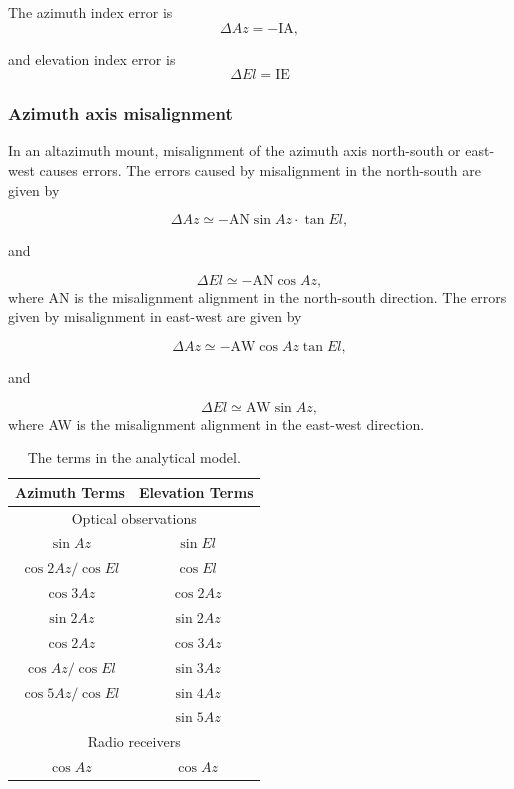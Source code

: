 The azimuth index error is 
\begin{equation}
    \Delta Az = -\text{IA},
\end{equation}

and elevation index error is
\begin{equation}\label{eq:pmodel_ie}
    \Delta El = \text{IE}
\end{equation}

\subsubsection{Azimuth axis misalignment} 

In an altazimuth mount, misalignment of the azimuth axis north-south or east-west causes errors.
The errors caused by misalignment in the north-south are given by

\begin{equation}
    \Delta Az \simeq - \text{AN} \sin{Az} \cdot \tan{El},
\end{equation}

and

\begin{equation}
    \Delta El \simeq - \text{AN} \cos{Az},
\end{equation}
where AN is the misalignment alignment in the north-south direction.
The errors given by misalignment in east-west are given by

\begin{equation}
    \Delta Az \simeq - \text{AW} \cos{Az} \tan{El},
\end{equation}

and

\begin{equation}
    \Delta El \simeq \text{AW} \sin{Az},
\end{equation}
where AW is the misalignment alignment in the east-west direction.

\begin{table}[h]
    \centering
    \caption{The terms in the analytical model. }
    \begin{tabular}{cc}
    \textbf{Azimuth Terms} & \textbf{Elevation Terms} \\
    \hline
    \multicolumn{2}{c}{Optical observations} \\ 
    \cline{1-2}
    \hline
    $\sin{Az}$ & $\sin{El}$ \\
    $\cos{2Az}/\cos{El}$ & $\cos{El}$ \\
    $\cos{3Az}$ & $\cos{2Az}$ \\
    $\sin{2Az}$ & $\sin{2Az}$ \\
    $\cos{2Az}$     & $\cos{3Az}$ \\
    $\cos{Az}/\cos{El}$ & $\sin{3Az}$ \\
    $\cos{5Az}/\cos{El}$ & $\sin{4Az}$ \\
    & $\sin{5Az}$ \\
    \multicolumn{2}{c}{Radio receivers} \\
    \cline{1-2}
    \hline
    $\cos{Az}$ & $\cos{Az}$ \\
    \end{tabular}
\end{table}

